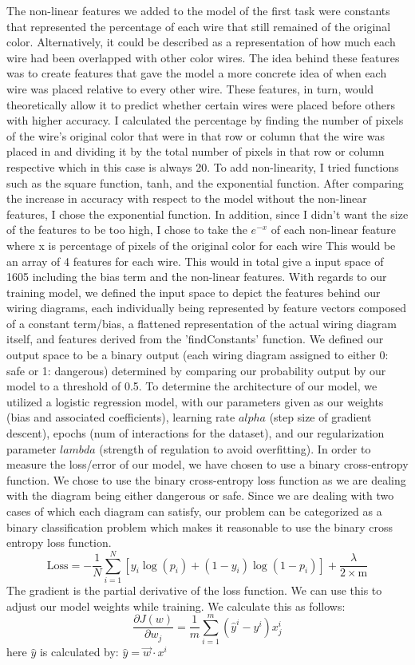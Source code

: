 \documentclass{article}
\begin{document}
\noindent The non-linear features we added to the model of the first task were constants that represented the percentage of each wire that still remained of the original color. Alternatively, it could be described as a representation
of how much each wire had been overlapped with other color wires. The idea behind these features was to create features that gave the model a more concrete idea of when each wire was placed relative to every other wire. 
These features, in turn, would theoretically allow it to predict whether certain wires were placed before others with higher accuracy. 
I calculated the percentage by finding the number of pixels of the wire’s original color that were in that row or column that the wire was placed in and dividing it by the total number of pixels in that row or column respective which in this case is always 20.
To add non-linearity, I tried functions such as the square function, tanh, and the exponential function. After comparing the increase in accuracy with respect to the model without the non-linear features, I chose the exponential function. In addition, since I didn't want the size of the features to be
too high, I chose to take the $e^{-x}$ of each non-linear feature where x is percentage of pixels of the original color for each wire This would be an array of 4 features for each wire. This would in total give a input space of 1605 including the bias term and the non-linear features. 
\newline With regards to our training model, we defined the input space to depict the features behind our wiring diagrams, each individually being represented by feature vectors composed of a constant term/bias,
a flattened representation  of the actual wiring diagram itself, and features derived from the 'findConstants' function.
We defined our output space to be a binary output (each wiring diagram assigned to either 0: safe or 1: dangerous) determined by comparing our probability output by our model to a threshold of 0.5.
To determine the architecture of our model, we utilized a logistic regression model, with our parameters given as our weights (bias and associated coefficients), learning rate $alpha$ (step size of gradient descent), epochs (num of interactions for the dataset), and our regularization parameter $lambda$ (strength of regulation to avoid overfitting).
In order to measure the loss/error of our model, we have chosen to use a binary cross-entropy function. We chose to use the binary cross-entropy loss function as we are dealing with the diagram being either dangerous or safe. Since we are dealing with two cases of which each diagram can satisfy, our problem can be categorized as a binary classification problem which makes it reasonable to use the binary cross entropy loss function. 
\[\textrm{Loss} = -\frac{1}{N} \sum_{i=1}^{N} \left[ y_i \log(p_i) + (1 - y_i) \log(1 - p_i) \right] + \frac{\lambda}{2 \times \textrm{m}} \]
The gradient is the partial derivative of the loss function. We can use this to adjust our model weights while training. We calculate this as follows:
\[
\frac{\partial J(w)}{\partial w_j} = \frac{1}{m} \sum_{i=1}^{m} (\hat{y}^{i} - y^{i}) x_j^{i}
\]
here $\hat{y}$ is calculated by: $\hat{y} = \vec{w} \cdot x^i$ \newline
\end{document}
